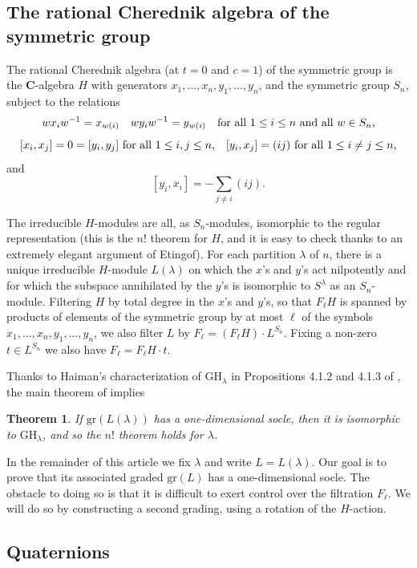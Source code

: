 \documentclass[12pt, reqno]{amsart}
\numberwithin{equation}{section}
\theoremstyle{definition}
\theoremstyle{plain}
\newtheorem{theorem}{Theorem}[section]
\newcommand{\CC}{\mathbf{C}}
\begin{document}
\subsection{The rational Cherednik algebra of the symmetric group}

The rational Cherednik algebra (at $t=0$ and $c=1$) of the symmetric group is the $\CC$-algebra $H$ with generators $x_1,\dots,x_n,y_1,\dots,y_n$, and the symmetric group $S_n$, subject to the relations
$$w x_i w^{-1}=x_{w(i)} \quad w y_i w^{-1}=y_{w(i)} \quad \hbox{for all $1 \leq i \leq n$ and all $w \in S_n$,}$$
$$[x_i,x_j]=0=[y_i,y_j] \ \hbox{for all $1 \leq i,j \leq n$,} \quad [y_i,x_j]=(ij) \ \hbox{for all $1 \leq i \neq j \leq n$,} $$ and
$$[y_i,x_i]=-\sum_{j \neq i} (ij).$$

The irreducible $H$-modules are all, as $S_n$-modules, isomorphic to the regular representation (this is the $n!$ theorem for $H$, and it is easy to check thanks to an extremely elegant argument of Etingof). For each partition $\lambda$ of $n$, there is a unique irreducible $H$-module $L(\lambda)$ on which the $x$'s and $y$'s act nilpotently and for which the subspace annihilated by the $y$'s is isomorphic to $S^\lambda$ as an $S_n$-module. Filtering $H$ by total degree in the $x$'s and $y$'s, so that $F_\ell H$ is spanned by products of elements of the symmetric group by at most $\ell$ of the symbols $x_1,\dots,x_n,y_1,\dots,y_n$, we also filter $L$ by $F_\ell =(F_\ell H) \cdot L^{S_n}$. Fixing a non-zero $t \in L^{S_n}$ we also have $F_\ell=F_\ell H \cdot t$.

Thanks to Haiman's characterization of $\mathrm{GH}_\lambda$ in Propositions 4.1.2 and 4.1.3 of \cite{Hai3}, the main theorem of  \cite{Gri1} implies
\begin{theorem}
If $\mathrm{gr}(L(\lambda))$ has a one-dimensional socle, then it is isomorphic to $\mathrm{GH}_\lambda$, and so the $n!$ theorem holds for $\lambda$. 
\end{theorem} In the remainder of this article we fix $\lambda$ and write $L=L(\lambda)$. Our goal is to prove that its associated graded $\mathrm{gr}(L)$  has a one-dimensional socle. The obstacle to doing so is that it is difficult to exert control over the filtration $F_\ell$. We will do so by constructing a second grading, using a rotation of the $H$-action.

\subsection{Quaternions}
\end{document}
